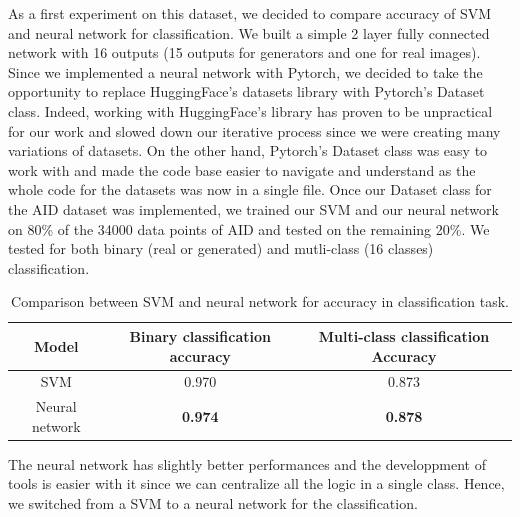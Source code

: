 \documentclass[12pt,a4paper]{article}
\begin{document}
As a first experiment on this dataset, we decided to compare accuracy of SVM and neural network for classification. We built a simple 2 layer fully connected network with 16 outputs (15 outputs for generators and one for real images). Since we implemented a neural network with Pytorch, we decided to take the opportunity to replace HuggingFace's datasets library with Pytorch's Dataset class. Indeed, working with HuggingFace's library has proven to be unpractical for our work and slowed down our iterative process since we were creating many variations of datasets. On the other hand, Pytorch's Dataset class was easy to work with and made the code base easier to navigate and understand as the whole code for the datasets was now in a single file. Once our Dataset class for the AID dataset was implemented, we trained our SVM and our neural network on 80\% of the 34000 data points of AID and tested on the remaining 20\%. We tested for both binary (real or generated) and mutli-class (16 classes) classification.

\begin{table}[H]
    \centering
    \begin{tabular}{|c|c|c|}
        \hline
        Model & Binary classification accuracy & Multi-class classification Accuracy\\
        \hline
        SVM & 0.970 & 0.873\\
        \hline
        Neural network & \textbf{0.974} & \textbf{0.878}\\
        \hline
    \end{tabular}
    \caption{Comparison between SVM and neural network for accuracy in classification task.}
    \label{table:svmVsNN}
\end{table}

The neural network has slightly better performances and the developpment of tools is easier with it since we can centralize all the logic in a single class. Hence, we switched from a SVM to a neural network for the classification.\\
\end{document}
